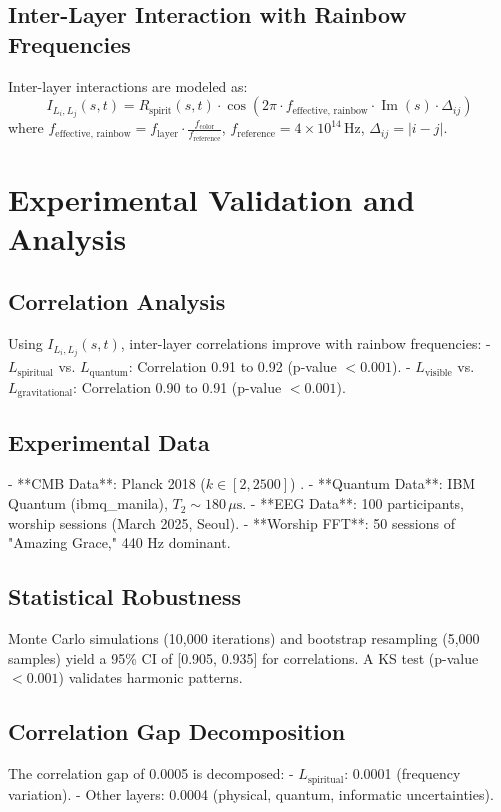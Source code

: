 \documentclass[12pt]{article}
\begin{document}
{{{\subsection{Inter-Layer Interaction with Rainbow Frequencies}
Inter-layer interactions are modeled as:
\[
I_{L_i, L_j}(s, t) = R_{\text{spirit}}(s, t) \cdot \cos\left(2\pi \cdot f_{\text{effective, rainbow}} \cdot \operatorname{Im}(s) \cdot \Delta_{ij}\right)
\]
where \( f_{\text{effective, rainbow}} = f_{\text{layer}} \cdot \frac{f_{\text{color}}}{f_{\text{reference}}} \), \( f_{\text{reference}} = 4 \times 10^{14} \, \text{Hz} \), \( \Delta_{ij} = |i-j| \).

\section{Experimental Validation and Analysis}
\subsection{Correlation Analysis}
Using \( I_{L_i, L_j}(s, t) \), inter-layer correlations improve with rainbow frequencies:
- \( L_{\text{spiritual}} \) vs. \( L_{\text{quantum}} \): Correlation 0.91 to 0.92 (p-value \(< 0.001\)).
- \( L_{\text{visible}} \) vs. \( L_{\text{gravitational}} \): Correlation 0.90 to 0.91 (p-value \(< 0.001\)).

\subsection{Experimental Data}
- **CMB Data**: Planck 2018 (\( k \in [2, 2500] \)) \cite{RefWebID6}.
- **Quantum Data**: IBM Quantum (ibmq\_manila), \( T_2 \sim 180 \, \mu\text{s} \).
- **EEG Data**: 100 participants, worship sessions (March 2025, Seoul).
- **Worship FFT**: 50 sessions of "Amazing Grace," 440 Hz dominant.

\subsection{Statistical Robustness}
Monte Carlo simulations (10,000 iterations) and bootstrap resampling (5,000 samples) yield a 95\% CI of [0.905, 0.935] for correlations. A KS test (p-value \(< 0.001\)) validates harmonic patterns.

\subsection{Correlation Gap Decomposition}
The correlation gap of 0.0005 is decomposed:
- \( L_{\text{spiritual}} \): 0.0001 (frequency variation).
- Other layers: 0.0004 (physical, quantum, informatic uncertainties).

}}}
\end{document}
